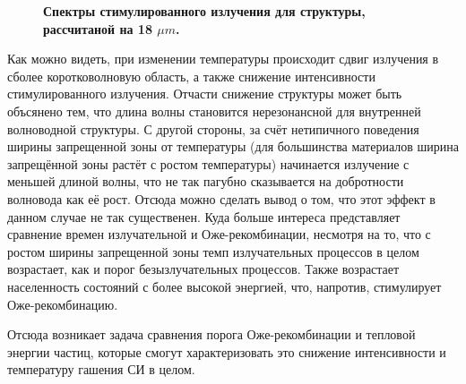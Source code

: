 \documentclass[../main.tex]{subfiles}
\begin{document}
\begin{figure}[h]
\begin{minipage}[h]{\linewidth}
\begin{center}
                \vspace{0.75cm}
                \textbf{Спектры стимулированного излучения для структуры, 
                    рассчитаной на 18 $\mu m$.}
                \vspace{0.75cm}
            \end{center}
        \end{minipage}
    \end{figure}

    Как можно видеть, при изменении температуры происходит сдвиг излучения в сболее коротковолновую область, а также снижение 
    интенсивности стимулированного излучения. Отчасти снижение структуры может быть объсянено тем, что длина волны становится 
    нерезонансной для внутренней волноводной структуры. С другой стороны, за счёт нетипичного поведения ширины запрещенной 
    зоны от температуры (для большинства материалов ширина запрещённой зоны растёт с ростом температуры) начинается излучение
    с меньшей длиной волны, что не так пагубно сказывается на добротности волновода как её рост. Отсюда можно сделать вывод о том, 
    что этот эффект в данном случае не так существенен. Куда больше интереса представляет сравнение времен излучательной и 
    Оже-рекомбинации, несмотря на то, что с ростом ширины запрещенной зоны темп излучательных процессов в целом возрастает, 
    как и порог безызлучательных процессов. Также возрастает населенность состояний с более высокой энергией, что, напротив,
    стимулирует Оже-рекомбинацию.

    Отсюда возникает задача сравнения порога Оже-рекомбинации и тепловой энергии частиц, которые смогут характеризовать это 
    снижение интенсивности и температуру гашения СИ в целом.
\end{document}
